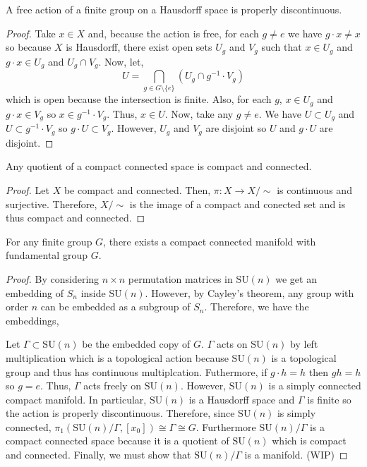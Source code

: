 \documentclass[12pt]{extarticle}
\newcommand{\SU}[1]{\mathrm{SU}(#1)}
\begin{document}
\begin{lemma}
A free action of a finite group on a Hausdorff space is properly discontinuous.  
\end{lemma}

\begin{proof}
Take $x \in X$ and, because the action is free, for each $g \neq e$ we have $g \cdot x \neq x$ so because $X$ is Hausdorff, there exist open sets $U_g$ and $V_g$ such that $x \in U_g$ and $g \cdot x \in U_g$ and $U_g \cap V_g$. Now, let,
\[U = \bigcap_{g \in G \setminus \{e\}} (U_g \cap g^{-1} \cdot V_g)\]
which is open because the intersection is finite. Also, for each $g$, $x \in U_g$ and $g \cdot x \in V_g$ so $x \in g^{-1} \cdot V_g$. Thus, $x \in U$. Now, take any $g \neq e$. We have $U \subset U_g$ and $U \subset g^{-1} \cdot V_g$ so $g \cdot U \subset V_g$. However, $U_g$ and $V_g$ are disjoint so $U$ and $g \cdot U$ are disjoint.  
\end{proof}


\begin{lemma}
Any quotient of a compact connected space is compact and connected.
\end{lemma}

\begin{proof}
Let $X$ be compact and connected. Then, $\pi : X \to X / \sim$ is continuous and surjective. Therefore, $X / \sim$ is the image of a compact and conected set and is thus compact and connected.
\end{proof}


\begin{theorem}
For any finite group $G$, there exists a compact connected manifold with fundamental group $G$.  
\end{theorem}

\begin{proof}
By considering $n \times n$ permutation matrices in $\SU{n}$ we get an embedding of $S_n$ inside $\SU{n}$. However, by Cayley's theorem, any group with order $n$ can be embedded as a subgroup of $S_n$. Therefore, we have the embeddings,
\begin{center}
\end{center}
Let $\Gamma \subset \SU{n}$ be the embedded copy of $G$. $\Gamma$ acts on $\SU{n}$ by left multiplication which is a topological action because $\SU{n}$ is a topological group and thus has continuous multiplcation. Futhermore, if $g \cdot h = h$ then $gh = h$ so $g = e$. Thus, $\Gamma$ acts freely on $\SU{n}$. However, $\SU{n}$ is a simply connected compact manifold. In particular, $\SU{n}$ is a Hausdorff space and $\Gamma$ is finite so the action is properly discontinuous. Therefore, since $\SU{n}$ is simply connected, $\pi_1(\SU{n}/\Gamma, [x_0]) \cong \Gamma \cong G$. Furthermore $\SU{n}/\Gamma$ is a compact connected space because it is a quotient of $\SU{n}$ which is compact and connected. Finally, we must show that $\SU{n}/\Gamma$ is a manifold. (WIP)    
\end{proof}
\end{document}
